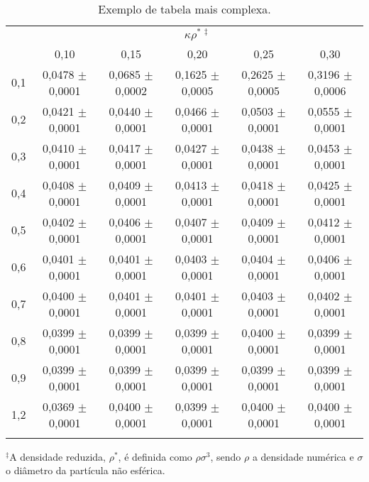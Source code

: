 \begin{table}[!htb]
  \centering
  \caption[Exemplo de tabela mais complexa.]{Exemplo de tabela mais complexa.}
  \label{tbl:complexa}
  \smallskip
  \begin{adjustbox}{width=1.0\textwidth}
  \begin{tabular}{ c c c c c c }
    \Xhline{3\arrayrulewidth}
    \multicolumn{1}{c}{\multirow{2}{*}{$\kappa$}} & \multicolumn{5}{c}{$\kappa\rho^{*\,\ddagger}$} \\
    \cline{2-6}
    \multicolumn{1}{c}{} & 0,10 & 0,15 & 0,20 & 0,25 & 0,30 \\
    \Xhline{3\arrayrulewidth}
    0,1 & 0,0478 $\pm$ 0,0001  & 
          0,0685 $\pm$ 0,0002 & 
          0,1625 $\pm$ 0,0005 & 
          0,2625 $\pm$ 0,0005 & 
          0,3196 $\pm$ 0,0006 \\
    0,2 & 0,0421 $\pm$ 0,0001  & 
          0,0440 $\pm$ 0,0001  & 
          0,0466 $\pm$ 0,0001  &
          0,0503 $\pm$ 0,0001 &
          0,0555 $\pm$ 0,0001 \\
    0,3 & 0,0410 $\pm$ 0,0001 & 
          0,0417 $\pm$ 0,0001 & 
          0,0427 $\pm$ 0,0001 &
          0,0438 $\pm$ 0,0001 &
          0,0453 $\pm$ 0,0001 \\
    0,4 & 0,0408 $\pm$ 0,0001 & 
          0,0409 $\pm$ 0,0001 & 
          0,0413 $\pm$ 0,0001 &
          0,0418 $\pm$ 0,0001 &
          0,0425 $\pm$ 0,0001 \\
    0,5 & 0,0402 $\pm$ 0,0001 & 
          0,0406 $\pm$ 0,0001 & 
          0,0407 $\pm$ 0,0001 &
          0,0409 $\pm$ 0,0001 &
          0,0412 $\pm$ 0,0001 \\
    0,6 & 0,0401 $\pm$ 0,0001 & 
          0,0401 $\pm$ 0,0001 & 
          0,0403 $\pm$ 0,0001 &
          0,0404 $\pm$ 0,0001 &
          0,0406 $\pm$ 0,0001 \\
    0,7 & 0,0400 $\pm$ 0,0001 & 
          0,0401 $\pm$ 0,0001 & 
          0,0401 $\pm$ 0,0001 &
          0,0403 $\pm$ 0,0001 &
          0,0402 $\pm$ 0,0001 \\
    0,8 & 0,0399 $\pm$ 0,0001 & 
          0,0399 $\pm$ 0,0001 & 
          0,0399 $\pm$ 0,0001 &
          0,0400 $\pm$ 0,0001 &
          0,0399 $\pm$ 0,0001 \\
    0,9 & 0,0399 $\pm$ 0,0001 & 
          0,0399 $\pm$ 0,0001 & 
          0,0399 $\pm$ 0,0001 &
          0,0399 $\pm$ 0,0001 &
          0,0399 $\pm$ 0,0001 \\
    1,2 & 0,0369 $\pm$ 0,0001 & 
          0,0400 $\pm$ 0,0001 & 
          0,0399 $\pm$ 0,0001 &
          0,0400 $\pm$ 0,0001 &
          0,0400 $\pm$ 0,0001 \\
    \Xhline{3\arrayrulewidth}
  \end{tabular}
  \end{adjustbox}
  \begin{flushleft}\footnotesize{$^{\ddagger}$A densidade reduzida, $\rho^{*}$, é definida como $\rho\sigma^3$, sendo $\rho$ a densidade numérica e $\sigma$ o diâmetro da partícula não esférica.}\end{flushleft}
\end{table}